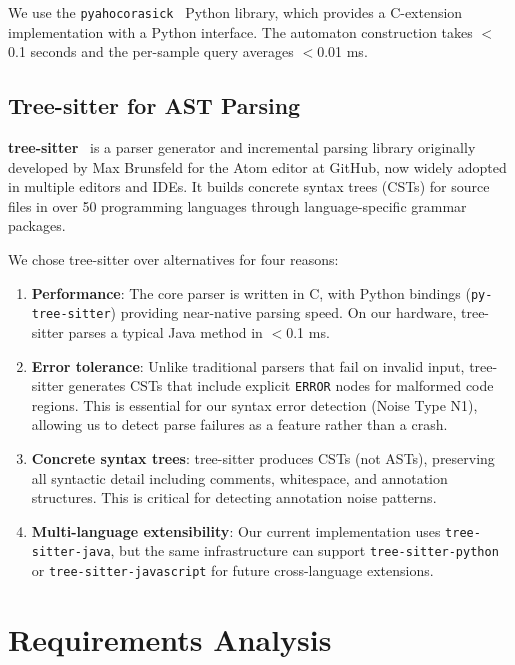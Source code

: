 \documentclass[acmlarge,nonacm,screen]{acmart}
\begin{document}
We use the \texttt{pyahocorasick}~\cite{pyahocorasick} Python library, which provides a C-extension implementation with a Python interface. The automaton construction takes $<$0.1 seconds and the per-sample query averages $<$0.01 ms.

\subsection{Tree-sitter for AST Parsing}

\textbf{tree-sitter}~\cite{brunsfeld2018treesitter} is a parser generator and incremental parsing library originally developed by Max Brunsfeld for the Atom editor at GitHub, now widely adopted in multiple editors and IDEs. It builds concrete syntax trees (CSTs) for source files in over 50 programming languages through language-specific grammar packages.

We chose tree-sitter over alternatives for four reasons:
\begin{enumerate}
    \item \textbf{Performance}: The core parser is written in C, with Python bindings (\texttt{py-tree-sitter}) providing near-native parsing speed. On our hardware, tree-sitter parses a typical Java method in $<$0.1 ms.
    \item \textbf{Error tolerance}: Unlike traditional parsers that fail on invalid input, tree-sitter generates CSTs that include explicit \texttt{ERROR} nodes for malformed code regions. This is essential for our syntax error detection (Noise Type N1), allowing us to detect parse failures as a feature rather than a crash.
    \item \textbf{Concrete syntax trees}: tree-sitter produces CSTs (not ASTs), preserving all syntactic detail including comments, whitespace, and annotation structures. This is critical for detecting annotation noise patterns.
    \item \textbf{Multi-language extensibility}: Our current implementation uses \texttt{tree-sitter-java}, but the same infrastructure can support \texttt{tree-sitter-python} or \texttt{tree-sitter-javascript} for future cross-language extensions.
\end{enumerate}


\section{Requirements Analysis}
\label{sec:requirements}
\end{document}
